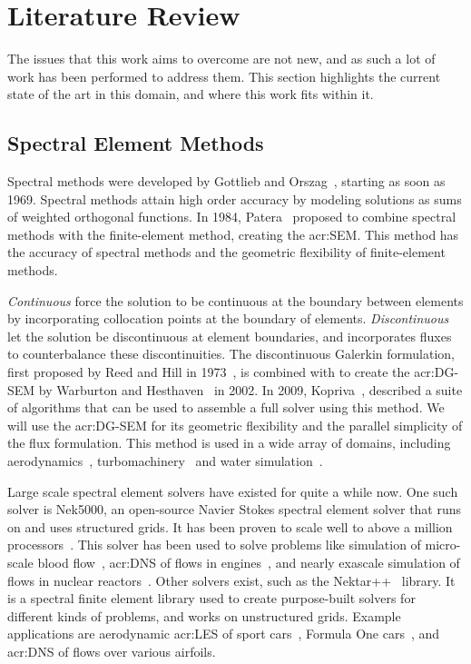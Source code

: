 \chapter{Literature Review}\label{chapter:literature_review} 

The issues that this work aims to overcome are not new, and as such a lot of work has been performed
to address them. This section highlights the current state of the art in this domain, and where this
work fits within it.

\section{Spectral Element Methods}\label{section:literature_review:sem}

Spectral methods were developed by Gottlieb and Orszag~\cite{Gottlieb1977}, starting as soon as
1969. Spectral methods attain high order accuracy by modeling solutions as sums of weighted
orthogonal functions. In 1984, Patera~\cite{Patera1984} proposed to combine spectral methods with
the finite-element method, creating the \acrfull{acr:SEM}. This method has the accuracy of spectral
methods and the geometric flexibility of finite-element methods.

\textit{Continuous}  force the solution to be continuous at the boundary between
elements by incorporating collocation points at the boundary of elements. \textit{Discontinuous}
 let the solution be discontinuous at element boundaries, and incorporates fluxes
to counterbalance these discontinuities. The discontinuous Galerkin formulation, first proposed by
Reed and Hill in 1973~\cite{Reed1973}, is combined with  to create the
\acrfull{acr:DG-SEM} by Warburton and Hesthaven~\cite{Hesthaven2002} in 2002. In 2009,
Kopriva~\cite{Kopriva2009}, described a suite of algorithms that can be used to assemble a full
solver using this method. We will use the \acrshort{acr:DG-SEM} for its geometric flexibility and
the parallel simplicity of the flux formulation. This method is used in a wide array of domains,
including aerodynamics~\cite{Beck2014}, turbomachinery~\cite{Garai2015} and water
simulation~\cite{Gassner2016}.

Large scale spectral element solvers have existed for quite a while now. One such solver is Nek5000,
an open-source Navier Stokes spectral element solver that runs on  and uses
structured grids. It has been proven to scale well to above a million
processors~\cite{Offermans2017}. This solver has been used to solve problems like simulation of
micro-scale blood flow~\cite{Obabko2017}, \acrfull{acr:DNS} of flows in engines~\cite{Ameen2020},
and nearly exascale simulation of flows in nuclear reactors~\cite{Merzari2020}. Other solvers exist,
such as the Nektar++~\cite{Cantwell2015} library. It is a spectral finite element library used to
create purpose-built solvers for different kinds of problems, and works on unstructured grids.
Example applications are aerodynamic \acrfull{acr:LES} of sport cars~\cite{Mengaldo2020}, Formula
One cars~\cite{Cantwell2015}, and \acrshort{acr:DNS} of flows over various airfoils.

